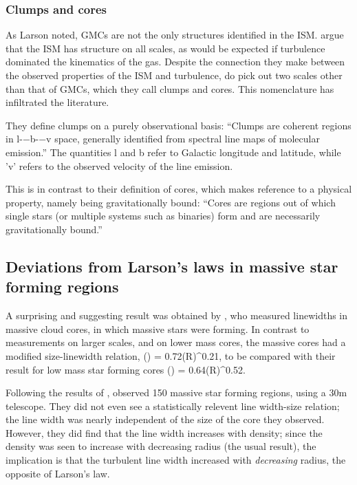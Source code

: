 \documentclass[../dissertation.tex]{subfiles}
\begin{document}
\subsubsection{Clumps and cores}
As Larson noted, GMCs are not the only structures identified in the ISM. \citet{2000prpl.conf...97W}  argue that the ISM has structure on all scales, as would be expected if turbulence dominated the kinematics of the gas. Despite the connection they make between the observed properties of the ISM and turbulence, \citet{2000prpl.conf...97W}  do pick out two scales other than that of GMCs, which they call clumps and cores. This nomenclature has infiltrated the literature.

They define clumps on a purely observational basis: ``Clumps are coherent regions in l-−b-−v space, generally identified from spectral line maps of molecular emission.'' The quantities l and b refer to Galactic longitude and latitude, while 'v' refers to the observed velocity of the line emission.

This is in contrast to their definition of cores, which makes reference to a physical property, namely being gravitationally bound: ``Cores are regions out of which single stars (or multiple systems such as binaries) form and are necessarily gravitationally bound.''

\subsection{Deviations from Larson's laws in massive star forming regions}

A surprising and suggesting result was obtained by \citet{1995ApJ...446..665C},%
who measured linewidths in massive cloud cores, in which massive stars were forming. In contrast to measurements on larger scales, and on lower mass cores, the massive cores had a modified size-linewidth relation,
%
\be
\left({\sigma\over \kms}\right) = 0.72\left({R\over \pc}\right)^{0.21},
\ee
%
to be compared with their result for low mass star forming cores
%
\be
\left({\sigma\over \kms}\right) = 0.64\left({R\over \pc}\right)^{0.52}.
\ee
%


Following the results of \citet{1995ApJ...446..665C}, 
\citet{1997ApJ...476..730P} observed 150 massive star forming regions, using a 30m telescope. %
They did not even see a statistically relevent line width-size relation; the line width was nearly independent of the size of the core they observed.
However, they did find that the line width increases with density; since the density was seen to increase with decreasing radius (the usual result), the implication is that the turbulent line width increased with {\em decreasing} radius, the opposite of Larson's law.
\end{document}
